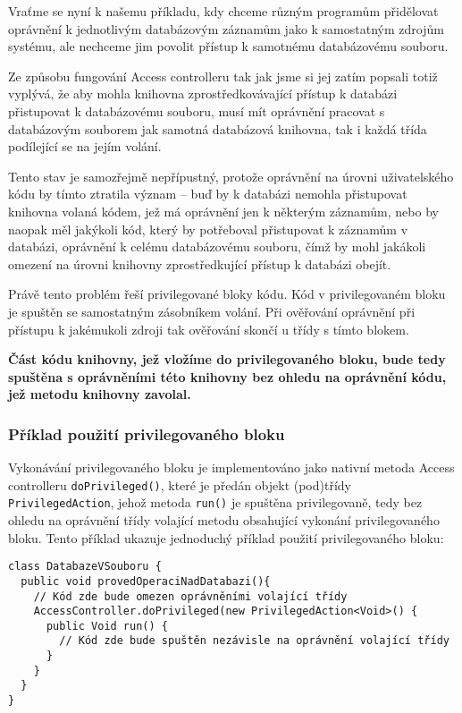 Vraťme se nyní k našemu příkladu, kdy chceme různým programům přidělovat oprávnění k jednotlivým databázovým záznamům jako k samostatným zdrojům systému, ale nechceme jim povolit přístup k samotnému databázovému souboru.

Ze způsobu fungování Access controlleru tak jak jsme si jej zatím popsali totiž vyplývá, že aby mohla knihovna zprostředkovávající přístup k databázi přistupovat k databázovému souboru, musí mít oprávnění pracovat s databázovým souborem jak samotná databázová knihovna, tak i každá třída podílející se na jejím volání.

Tento stav je samozřejmě nepřípustný, protože oprávnění na úrovni uživatelského kódu by tímto ztratila význam -- buď by k databázi nemohla přistupovat knihovna volaná kódem, jež má oprávnění jen k některým záznamům, nebo by naopak měl jakýkoli kód, který by potřeboval přistupovat k záznamům v databázi, oprávnění k celému databázovému souboru, čímž by mohl jakákoli omezení na úrovni knihovny zprostředkující přístup k databázi obejít.

Právě tento problém řeší privilegované bloky kódu. Kód v privilegovaném bloku je spuštěn se samostatným zásobníkem volání. Při ověřování oprávnění při přístupu k jakémukoli zdroji tak ověřování skončí u třídy s tímto blokem.

{\bf Část kódu knihovny, jež vložíme do privilegovaného bloku, bude tedy spuštěna s oprávněními této knihovny bez ohledu na oprávnění kódu, jež metodu knihovny zavolal.}

\subsubsection{Příklad použití privilegovaného bloku}

Vykonávání privilegovaného bloku je implementováno jako nativní metoda Access controlleru {\tt doPrivileged()}, které je předán objekt (pod)třídy {\tt PrivilegedAction}, jehož metoda {\tt run()} je spuštěna privilegovaně, tedy bez ohledu na oprávnění třídy volající metodu obsahující vykonání privilegovaného bloku.
Tento příklad ukazuje jednoduchý příklad použití privilegovaného bloku: \cite{refAccessController}

\begin{verbatim}
class DatabazeVSouboru {
  public void provedOperaciNadDatabazi(){
    // Kód zde bude omezen oprávněními volající třídy
    AccessController.doPrivileged(new PrivilegedAction<Void>() {
      public Void run() {
        // Kód zde bude spuštěn nezávisle na oprávnění volající třídy
      }
    }
  }
}
\end{verbatim}

